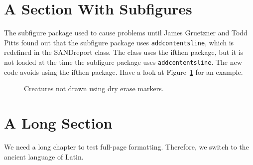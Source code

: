 \documentclass[pdf,ps2pdf,12pt]{SANDreport}
\begin{document}
    \section{A Section With Subfigures}
	The subfigure package used to cause problems until James
	Gruetzner and Todd Pitts found out that the subfigure
	package uses {\tt addcontentsline}, which is redefined in
	the SANDreport class. The class uses the ifthen package,
	but it is not loaded at the time the subfigure package
	uses {\tt addcontentsline}.  The new code avoids using the
	ifthen package.  Have a look at Figure~\ref{fig:creatures}
	for an example.

	\begin{figure}[!btp]
	    \centering
	    \caption{Creatures not drawn using dry erase markers.}
	    \label{fig:creatures}
	\end{figure}



    \section{A Long Section}\label{sec:long}
	We need a long chapter to test full-page formatting. Therefore,
	we switch to the ancient language of Latin.
\end{document}
